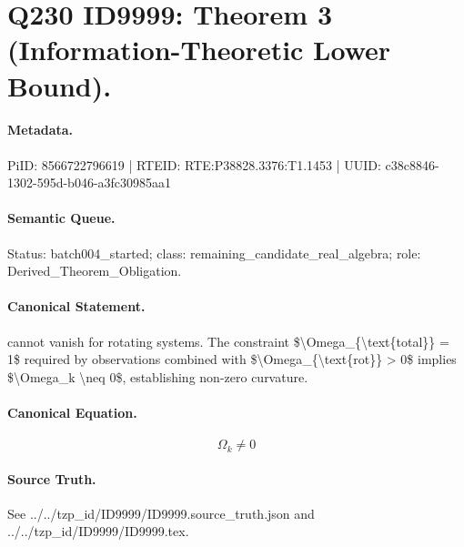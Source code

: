 \section*{Q230 ID9999: Theorem 3 (Information-Theoretic Lower Bound).}
\paragraph{Metadata.}
PiID: 8566722796619 | RTEID: RTE:P38828.3376:T1.1453 | UUID: c38c8846-1302-595d-b046-a3fc30985aa1

\paragraph{Semantic Queue.}
Status: batch004\_started; class: remaining\_candidate\_real\_algebra; role: Derived\_Theorem\_Obligation.

\paragraph{Canonical Statement.}
cannot vanish for rotating systems. The constraint \$\textbackslash{}Omega\_\{\textbackslash{}text\{total\}\} = 1\$ required by observations combined with \$\textbackslash{}Omega\_\{\textbackslash{}text\{rot\}\} > 0\$ implies \$\textbackslash{}Omega\_k \textbackslash{}neq 0\$, establishing non-zero curvature.

\paragraph{Canonical Equation.}
\[
\Omega_k \neq 0
\]

\paragraph{Source Truth.}
See ../../tzp\_id/ID9999/ID9999.source\_truth.json and ../../tzp\_id/ID9999/ID9999.tex.
